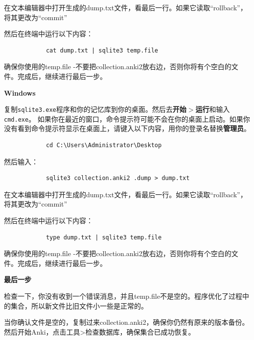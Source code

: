 \documentclass[a4paper]{book}
\begin{document}
		在文本编辑器中打开生成的dump.txt文件，看最后一行。如果它读取“rollback”，将其更改为“commit”
		
		然后在终端中运行以下内容：
		
		\begin{shaded}\begin{verbatim}
			cat dump.txt | sqlite3 temp.file
			\end{verbatim}\end{shaded}
		
		确保你使用的temp.file -不要把collection.anki2放右边，否则你将有个空白的文件。完成后，继续进行最后一步。
		
		\textbf{Windows}
		
		复制\texttt{sqlite3.exe}程序和你的记忆库到你的桌面。然后去\textbf{开始$>$运行}和输入\texttt{cmd.exe}。              如果你在最近的窗口，命令提示符可能不会在你的桌面上启动。如果你没有看到命令提示符显示在桌面上，请键入以下内容，用你的登录名替换\textbf{管理员}。
		
		\begin{shaded}\begin{verbatim}
			cd C:\Users\Administrator\Desktop
			\end{verbatim}\end{shaded}
		
		然后输入：
		
		\begin{shaded}\begin{verbatim}
			sqlite3 collection.anki2 .dump > dump.txt
			\end{verbatim}\end{shaded}
		
		在文本编辑器中打开生成的dump.txt文件，看最后一行。如果它读取“rollback”，将其更改为“commit”
		
		然后在终端中运行以下内容：
		
		\begin{shaded}\begin{verbatim}
			type dump.txt | sqlite3 temp.file
			\end{verbatim}\end{shaded}
		
		确保你使用的temp.file -不要把collection.anki2放右边，否则你将有个空白的文件。完成后，继续进行最后一步。
		
		\textbf{最后一步}
		
		检查一下，你没有收到一个错误消息，并且temp.file不是空的。程序优化了过程中的集合，所以新文件比旧文件小一些是正常的。
		
		当你确认文件是空的，复制过来collection.anki2，确保你仍然有原来的版本备份。然后开始Anki，点击工具>检查数据库，确保集合已成功恢复。
		
\end{document}
